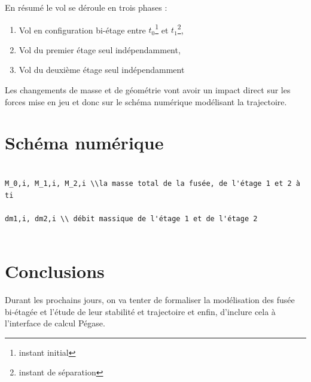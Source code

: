 \documentclass[a4paper]{article}
\begin{document}
En résumé le vol se déroule en trois phases : 

\begin{enumerate}

\item Vol en configuration bi-étage entre $t_{0}$\footnote{instant initial} et $t_{1}$\footnote{instant de séparation},
\item Vol du premier étage seul indépendamment,
\item Vol du deuxième étage seul indépendamment

\end{enumerate}

Les changements de masse et de géométrie vont avoir un impact direct sur les forces mise en jeu et donc sur le schéma numérique modélisant la trajectoire.


\section{Schéma numérique}

\begin{verbatim}

M_0,i, M_1,i, M_2,i \\la masse total de la fusée, de l'étage 1 et 2 à ti

dm1,i, dm2,i \\ débit massique de l'étage 1 et de l'étage 2


\end{verbatim}




\section{Conclusions}

Durant les prochains jours, on va tenter de formaliser la modélisation des fusée bi-étagée et l'étude de leur stabilité et trajectoire et enfin, d'inclure cela à l'interface de calcul Pégase.


%
%
\end{document}
